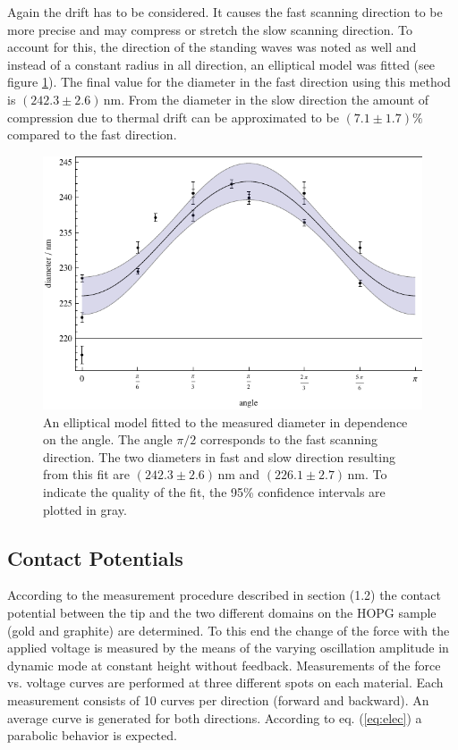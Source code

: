 \documentclass[a4paper]{scrartcl}
\numberwithin{equation}{section}
\numberwithin{figure}{section}
\numberwithin{table}{section}
\newcommand{\Formel}[1]{(\ref{#1})}
\begin{document}
Again the drift has to be considered. It causes the fast scanning direction to be more precise and may compress or stretch the slow scanning direction. To account for this, the direction of the standing waves was noted as well and instead of a constant radius in all direction, an elliptical model was fitted (see figure \ref{fig:diameterfit}). The final value for the diameter in the fast direction using this method is $(242.3\pm 2.6)\,\text{nm}$. From the diameter in the slow direction the amount of compression due to thermal drift can be approximated to be $(7.1\pm1.7)\%$ compared to the fast direction.

\begin{figure}
\centering
	\includegraphics[width=0.8\linewidth]{img/diameterfit.pdf}
	\caption{\small An elliptical model fitted to the measured diameter in dependence on the angle. The angle $\pi/2$ corresponds to the fast scanning direction. The two diameters in fast and slow direction resulting from this fit are $(242.3\pm2.6)\,\text{nm}$ and $(226.1\pm2.7)\,\text{nm}$. To indicate the quality of the fit, the 95\% confidence intervals are plotted in gray. }
	\label{fig:diameterfit}
\end{figure}

\FloatBarrier
\subsection{Contact Potentials}
According to the measurement procedure described in section \textrm{(1.2)} the contact potential between the tip and the two different domains on the HOPG sample (gold and graphite) are determined. To this end the change of the force with the applied voltage is measured by the means of the varying oscillation amplitude in dynamic mode at constant height without feedback. Measurements of the force vs. voltage curves are performed at three different spots on each material. Each measurement consists of 10 curves per direction (forward and backward). An average curve is generated for both directions. According to eq. \Formel{eq:elec} a parabolic behavior is expected. 
\end{document}

